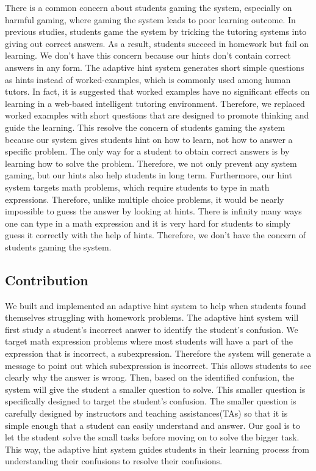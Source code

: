 \documentclass{article} %
\begin{document}
There is a common concern about students gaming the system, especially on harmful gaming, where gaming the system leads to poor learning outcome\cite{Baker2004}\cite{Baker2005}. In previous studies, students game the system by tricking the tutoring systems into giving out correct answers\cite{Baker2004Off-task}. As a result, students succeed in homework but fail on learning. We don't have this concern because our hints don't contain correct answers in any form. The adaptive hint system generates short simple questions as hints instead of worked-examples, which is commonly used among human tutors\cite{Atkinson2000}. In fact, it is suggested that worked examples have no significant effects on learning in a web-based intelligent tutoring environment\cite{McLaren2006}. Therefore, we replaced worked examples with short questions that are designed to promote thinking and guide the learning. This resolve the concern of students gaming the system because our system gives students hint on how to learn, not how to answer a specific problem. The only way for a student to obtain correct answers is by learning how to solve the problem. Therefore, we not only prevent any system gaming, but our hints also help students in long term. Furthermore, our hint system targets math problems, which require students to type in math expressions. Therefore, unlike multiple choice problems, it would be nearly impossible to guess the answer by looking at hints. There is infinity many ways one can type in a math expression and it is very hard for students to simply guess it correctly with the help of hints. Therefore, we don't have the concern of students gaming the system.

\subsection*{Contribution}
We built and implemented an adaptive hint system to help when students found themselves struggling with homework problems. The adaptive hint system will first study a student's incorrect answer to identify the student's confusion. We target math expression problems where most students will have a part of the expression that is incorrect, a subexpression. Therefore the system will generate a message to point out which subexpression is incorrect. This allows students to see clearly why the answer is wrong. Then, based on the identified confusion, the system will give the student a smaller question to solve. This smaller question is specifically designed to target the student's confusion. The smaller question is carefully designed by instructors and teaching assistances(TAs) so that it is simple enough that a student can easily understand and answer. Our goal is to let the student solve the small tasks before moving on to solve the bigger task. This way, the adaptive hint system guides students in their learning process from understanding their confusions to resolve their confusions.
\end{document}

